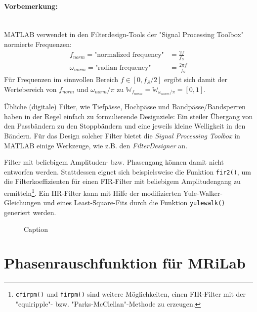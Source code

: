 \paragraph{Vorbemerkung:}\mbox{}\\
MATLAB verwendet in den Filterdesign-Tools der "Signal Processing Toolbox" normierte Frequenzen:
\begin{subequations}
	\begin{align}
	f_{norm} = \text{"normalized frequency"} &= \frac{2f}{f_S} \\
	\omega_{norm} = \text{"radian frequency"} &= \frac{2\pi f}{f_S}
	\end{align}
\end{subequations}
Für Frequenzen im sinnvollen Bereich $f\in [0,f_S/2]$ ergibt sich damit der Wertebereich von
$f_{norm}$ und $\omega_{norm}/\pi$ zu $\mathbb{W}_{f_{norm}}=\mathbb{W}_{\omega_{norm}/\pi}=[0,1]$.

Übliche (digitale) Filter, wie Tiefpässe, Hochpässe und Bandpässe/Bandsperren haben in der Regel einfach zu formulierende Designziele: Ein steiler Übergang von den Passbändern zu den Stoppbändern und eine jeweils kleine Welligkeit in den Bändern.
Für das Design solcher Filter bietet die \textit{Signal Processing Toolbox} in MATLAB einige Werkzeuge, wie z.B. den \textit{FilterDesigner} an.

Filter mit beliebigem Amplituden- bzw. Phasengang können damit nicht entworfen werden. Stattdessen eignet sich beispielsweise die Funktion \texttt{fir2()}, um die Filterkoeffizienten für einen FIR-Filter mit beliebigem Amplitudengang zu ermitteln\footnote{\texttt{cfirpm()} und \texttt{firpm()} sind weitere Möglichkeiten, einen FIR-Filter mit der "equiripple"- bzw. "Parks-McClellan"-Methode zu erzeugen.}. Ein IIR-Filter kann mit Hilfe der modifizierten Yule-Walker-Gleichungen und eines Least-Square-Fits durch die Funktion \texttt{yulewalk()} generiert werden.


\begin{figure}[H]
	\centering
	\hfill
	\caption{Caption}
\end{figure}




\section{Phasenrauschfunktion für MRiLab}
